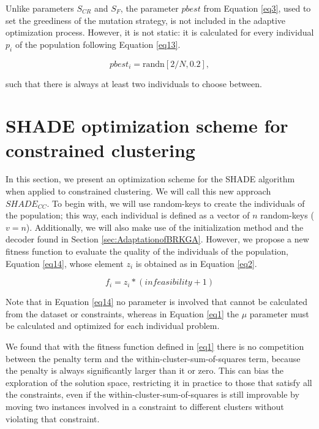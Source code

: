 \documentclass[review]{elsarticle}
\begin{document}
Unlike parameters $S_{CR}$ and $S_F$, the parameter $pbest$ from Equation \eqref{eq3}, used to set the greediness of the mutation strategy, is not included in the adaptive optimization process. However, it is not static: it is calculated for every individual $p_i$ of the population following Equation \eqref{eq13}.

\begin{equation}
pbest_i = \text{randn}[2/N, 0.2],
\label{eq13}
\end{equation}

\noindent such that there is always at least two individuals to choose between.

\section{SHADE optimization scheme for constrained clustering} \label{sec:SHADEadapt}

In this section, we present an optimization scheme for the SHADE algorithm when applied to constrained clustering. We will call this new approach $SHADE_{CC}$. To begin with, we will use random-keys to create the individuals of the population; this way, each individual is defined as a vector of $n$ random-keys ($v = n$). Additionally, we will also make use of the initialization method and the decoder found in Section \ref{sec:AdaptationofBRKGA}. However, we propose a new fitness function to evaluate the quality of the individuals of the population, Equation \eqref{eq14}, whose element $z_i$ is obtained as in Equation \eqref{eq2}.

\begin{equation}
f_i = z_i * (infeasibility + 1)
\label{eq14}
\end{equation}

Note that in Equation \eqref{eq14} no parameter is involved that cannot be calculated from the dataset or constraints, whereas in Equation \eqref{eq1} the $\mu$ parameter must be calculated and optimized for each individual problem.

We found that with the fitness function defined in \eqref{eq1} there is no competition between the penalty term and the within-cluster-sum-of-squares term, because the penalty is always significantly larger than it or zero. This can bias the exploration of the solution space, restricting it in practice to those that satisfy all the constraints, even if the within-cluster-sum-of-squares is still improvable by moving two instances involved in a constraint to different clusters without violating that constraint.
\end{document}

